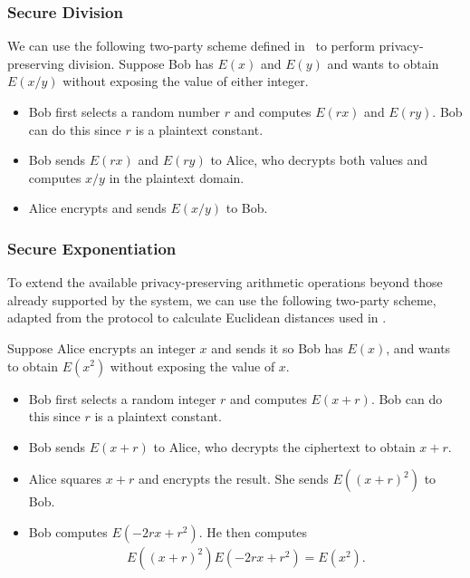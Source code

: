 \subsubsection{Secure Division}
We can use the following two-party scheme defined in~\cite{boukoros_lightweight_2017} to perform privacy-preserving division.
Suppose Bob has $E(x)$ and $E(y)$ and wants to obtain $E(x/y)$ without exposing the value of either integer.
\begin{itemize}
	\item Bob first selects a random number $r$ and computes $E(rx)$ and $E(ry)$. Bob can do this since $r$ is a plaintext constant.
	\item Bob sends $E(rx)$ and $E(ry)$ to Alice, who decrypts both values and computes $x/y$ in the plaintext domain.
	\item Alice encrypts and sends $E(x/y)$ to Bob.
\end{itemize}

\subsubsection{Secure Exponentiation}
\label{ssec:exponentiationprotocol}
To extend the available privacy-preserving arithmetic operations beyond those already supported by the system, we can use the following two-party scheme, adapted from the protocol to calculate Euclidean distances used in \cite{hutchison_privacy-preserving_2009}.

Suppose Alice encrypts an integer $x$ and sends it so Bob has $E(x)$, and wants to obtain $E(x^2)$ without exposing the value of $x$.
\begin{itemize}
	\item Bob first selects a random integer $r$ and computes $E(x+r)$. Bob can do this since $r$ is a plaintext constant.
	\item Bob sends $E(x+r)$ to Alice, who decrypts the ciphertext to obtain $x+r$.
	\item Alice squares $x+r$ and encrypts the result. She sends $E((x+r)^2)$ to Bob.
	\item Bob computes $E(-2rx + r^2)$. He then computes
	\begin{align*}
		E((x+r)^2)E(-2rx + r^2) = E(x^2).
	\end{align*}
\end{itemize}

